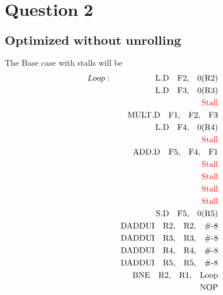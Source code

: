 \documentclass{tufte-handout}
\begin{document}
\section{$\textbf{Question 2}$}
	\subsection{$\textbf{Optimized without unrolling}$}
		The Base case with stalls will be
		\begin{eqnarray*}
			Loop : & & \mbox{ L.D\quad F2,\quad 0(R2)} \\
			       & & \mbox{ L.D\quad F3,\quad 0(R3)} \\
			       & & \mbox{ \textcolor{red}{Stall}} \\
			       & & \mbox{ MULT.D\quad F1,\quad F2,\quad F3} \\
			       & & \mbox{ L.D\quad F4,\quad 0(R4)} \\
			       & & \mbox{ \textcolor{red}{Stall}} \\
			       & & \mbox{ ADD.D\quad F5,\quad F4,\quad F1} \\
			       & & \mbox{ \textcolor{red}{Stall}} \\
			       & & \mbox{ \textcolor{red}{Stall}} \\
			       & & \mbox{ \textcolor{red}{Stall}} \\
			       & & \mbox{ \textcolor{red}{Stall}} \\
			       & & \mbox{ S.D\quad F5,\quad 0(R5)} \\
			       & & \mbox{ DADDUI\quad R2,\quad R2,\quad \#-8} \\
			       & & \mbox{ DADDUI\quad R3,\quad R3,\quad \#-8} \\
			       & & \mbox{ DADDUI\quad R4,\quad R4,\quad \#-8} \\
			       & & \mbox{ DADDUI\quad R5,\quad R5,\quad \#-8} \\
		       	   & & \mbox{ BNE\quad R2,\quad R1,\quad Loop} \\
		       	   & & \mbox{ NOP} \\
		\end{eqnarray*}
\end{document}
